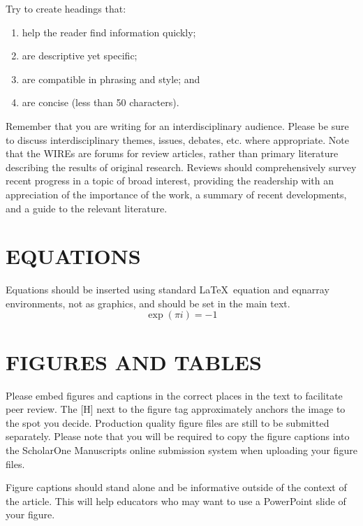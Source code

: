 \documentclass[12pt]{article}
\begin{document}
Try to create headings that:
\begin{enumerate}
\item  help the reader find information quickly; 
\item are descriptive yet specific; 
\item are compatible in phrasing and style; and 
\item are concise (less than 50 characters). 
\end{enumerate}

Remember that you are writing for an interdisciplinary audience. Please be sure to discuss interdisciplinary themes, issues, debates, etc. where appropriate. Note that the WIREs are forums for review articles, rather than primary literature describing the results of original research. Reviews should comprehensively survey recent progress in a topic of broad interest, providing the readership with an appreciation of the importance of the work, a summary of recent developments, and a guide to the relevant literature.

\section*{\sffamily \Large EQUATIONS}
Equations should be inserted using standard \LaTeX\ equation and eqnarray environments, not as graphics, and should be set in the main text.
\begin{equation}
\exp (\pi i) = -1
\end{equation}

\section*{\sffamily \Large FIGURES AND TABLES}
Please embed figures and captions in the correct places in the text to facilitate peer review. The [H] next to the figure tag approximately anchors the image to the spot you decide. Production quality figure files are still to be submitted separately. Please note that you will be required to copy the figure captions into the ScholarOne Manuscripts online submission system when uploading your figure files.

Figure captions should stand alone and be informative outside of the context of the article. This will help educators who may want to use a PowerPoint slide of your figure. 
\end{document}
